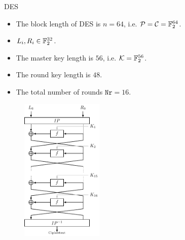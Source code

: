 \begin{frame}{DES}
    \begin{itemize}
        \item The block length of DES is $n=64$, i.e. $\mathcal{P}=\mathcal{C}={\mathbb F}_2^{64}$.
        \item $L_i,R_i\in{\mathbb F}_2^{32}$.
        \item The master key length is $56$, i.e. $\mathcal{K}={\mathbb F}_2^{56}$.
        \item The round key length is $48$.
        \item The total number of rounds $\texttt{Nr}=16$.
    \end{itemize}
\end{frame}

\begin{frame}{}
    \begin{figure}[htb]
    \centering
    \includegraphics[width=0.35\textwidth]{fig/DES.pdf}
\end{figure}
\end{frame}


